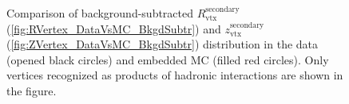 \begin{figure}[hb]
{\begin{subfigure}[b]{\linewidth}
  \end{subfigure}
}%
\caption[Comparison of background-subtracted $R_{\text{vtx}}^{\text{secondary}}$ and $z_{\text{vtx}}^{\text{secondary}}$ distribution in the data and embedded MC.]%
    {Comparison of background-subtracted $R_{\text{vtx}}^{\text{secondary}}$ (\ref{fig:RVertex_DataVsMC_BkgdSubtr}) and $z_{\text{vtx}}^{\text{secondary}}$ (\ref{fig:ZVertex_DataVsMC_BkgdSubtr}) distribution in the data (opened black circles) and embedded MC (filled red circles). Only vertices recognized as products of hadronic interactions are shown in the figure.}\label{fig:RZVertexDataVsMC_BkgdSubtr}%
\end{figure}
